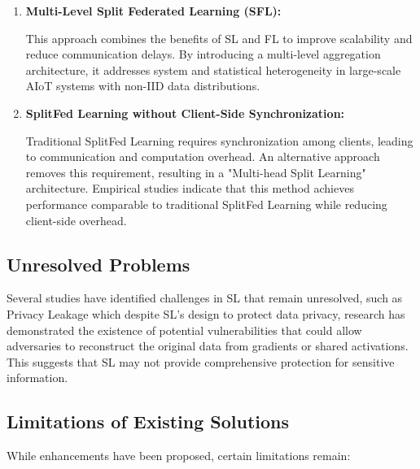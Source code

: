 \begin{enumerate}

	\item \textbf{Multi-Level Split Federated Learning (\gls{SFL}):} 
	
	This approach combines the benefits of \gls{SL} and \gls{FL} to improve scalability and reduce communication delays. By introducing a multi-level aggregation architecture, it addresses system and statistical heterogeneity in large-scale AIoT systems with non-IID data distributions.
	
	\item \textbf{SplitFed Learning without Client-Side Synchronization:}
	 
	Traditional SplitFed Learning requires synchronization among clients, leading to communication and computation overhead. An alternative approach removes this requirement, resulting in a "Multi-head Split Learning" architecture. Empirical studies indicate that this method achieves performance comparable to traditional SplitFed Learning while reducing client-side overhead. 

\end{enumerate}

\subsection{Unresolved Problems}
\label{sec:sl_unresolved_problems}

Several studies have identified challenges in SL that remain unresolved, such as Privacy Leakage which despite \gls{SL}'s design to protect data privacy, research has demonstrated the existence of potential vulnerabilities that could allow adversaries to reconstruct the original data from gradients or shared activations. This suggests that \gls{SL} may not provide comprehensive protection for sensitive information.

\subsection{Limitations of Existing Solutions}
\label{sec:limitations_on_existing_solutions}

While enhancements have been proposed, certain limitations remain:

